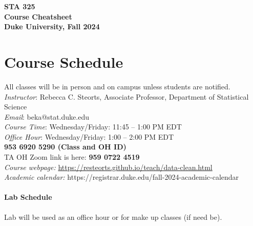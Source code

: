 \documentclass[11pt]{article}
\date{}
\begin{document}
\begin{center}
{\Large\bf STA 325\\ Course Cheatsheet} \\

{\Large\bf Duke University, Fall 2024} \\
\end{center}


\section{Course Schedule}
All classes will be in person and on campus unless students are notified. \\
\emph{Instructor}: Rebecca C. Steorts,  Associate Professor,  Department of Statistical Science\\
\emph{Email}: beka@stat.duke.edu\\
\emph{Course Time}: Wednesday/Friday: 11:45 -- 1:00 PM EDT \\
\emph{Office Hour}: Wednesday/Friday: 1:00 -- 2:00 PM EDT \\
\textbf{953 6920 5290 (Class and OH ID)}\\
TA OH Zoom link is here: \textbf{959 0722 4519}\\
\emph{Course webpage:} \url{https://resteorts.github.io/teach/data-clean.html} \\
\emph{Academic calendar:} https://registrar.duke.edu/fall-2024-academic-calendar


\paragraph{Lab Schedule}
Lab will be used as an office hour or for make up classes (if need be). 
\end{document}

